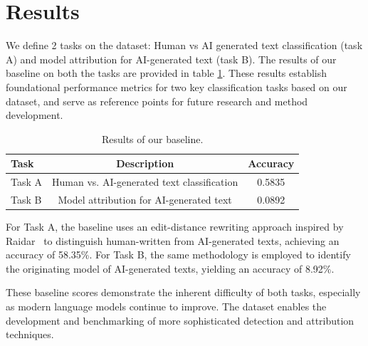 \section{Results}

We define 2 tasks on the dataset: Human vs AI generated text classification (task A) and model attribution for AI-generated text (task B). The results of our baseline on both the tasks are provided in table \ref{tab:result}. These results establish foundational performance metrics for two key classification tasks based on our dataset, and serve as reference points for future research and method development.



\begin{table}[h]
\centering
\begin{tabular}{|l|c|c|}
\hline
\textbf{Task} & \textbf{Description} & \textbf{Accuracy} \\
\hline
Task A & Human vs. AI-generated text classification & 0.5835 \\
\hline
Task B & Model attribution for AI-generated text    & 0.0892 \\
\hline
\end{tabular}
\caption{Results of our baseline. }
\label{tab:result}
\end{table}

For Task A, the baseline uses an edit-distance rewriting approach inspired by Raidar~\cite{mao2024raidargenerativeaidetection} to distinguish human-written from AI-generated texts, achieving an accuracy of 58.35\%. For Task B, the same methodology is employed to identify the originating model of AI-generated texts, yielding an accuracy of 8.92\%.

These baseline scores demonstrate the inherent difficulty of both tasks, especially as modern language models continue to improve. The dataset enables the development and benchmarking of more sophisticated detection and attribution techniques.
